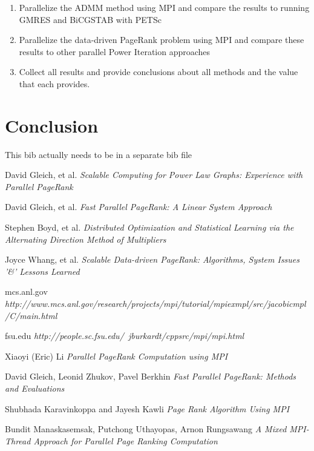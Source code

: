 \documentclass[letterpaper,12pt,onecolumn]{article}
\begin{document}
\begin{enumerate}
	\item Parallelize the ADMM method using MPI and compare the results to running GMRES and BiCGSTAB with PETSc
	\item Parallelize the data-driven PageRank problem using MPI and compare these results to other parallel Power Iteration approaches
	\item Collect all results and provide conclusions about all methods and the value that each provides.
\end{enumerate}


\section{Conclusion}

This bib actually needs to be in a separate bib file
\begin{thebibliography}{1}

 David Gleich, et al. {\em Scalable Computing for Power Law Graphs: Experience with Parallel PageRank}

 David Gleich, et al. {\em Fast Parallel PageRank: A Linear System Approach} 

 Stephen Boyd, et al. {\em Distributed Optimization and Statistical Learning via the Alternating Direction Method of Multipliers} 

 Joyce Whang, et al. {\em Scalable Data-driven PageRank: Algorithms, System Issues '\&' Lessons Learned}
 
  mcs.anl.gov {\em http://www.mcs.anl.gov/research/projects/mpi/tutorial/mpiexmpl/src/jacobicmpl/C/main.html}
 
  fsu.edu {\em http://people.sc.fsu.edu/~jburkardt/cppsrc/mpi/mpi.html}

  Xiaoyi (Eric) Li  {\em Parallel PageRank Computation using MPI}

  David Gleich, Leonid Zhukov, Pavel Berkhin  {\em Fast Parallel PageRank: Methods and Evaluations}

  Shubhada Karavinkoppa and Jayesh Kawli  {\em Page Rank Algorithm Using MPI}

  Bundit Manaskasemsak, Putchong Uthayopas, Arnon Rungsawang {\em A Mixed MPI-Thread Approach for Parallel Page Ranking Computation}

\end{thebibliography}
\end{document}
